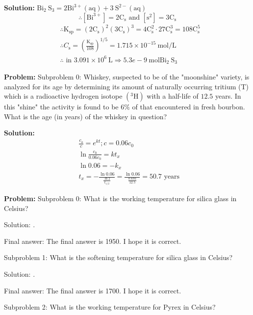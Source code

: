 \documentclass[10pt]{article}
\begin{document}
\textbf{Solution:}
$\mathrm{Bi}_{2} \mathrm{~S}_{3}=2 \mathrm{Bi}^{3+}(\mathrm{aq})+3 \mathrm{~S}^{2-}(\mathrm{aq})$
\[
\therefore\left[\mathrm{Bi}^{3+}\right]=2 \mathrm{C}_{\mathrm{s}} \text { and }\left[\mathrm{s}^{2}\right]=3 \mathrm{C}_{\mathrm{s}}
\]
\[
\begin{aligned}
& \therefore \mathrm{K}_{\mathrm{sp}}=\left(2 \mathrm{C}_{\mathrm{s}}\right)^{2}\left(3 \mathrm{C}_{\mathrm{s}}\right)^{3}=4 \mathrm{C}_{\mathrm{s}}^{2} \cdot 27 \mathrm{C}_{\mathrm{s}}^{3}=108 \mathrm{C}_{\mathrm{s}}^{5} \\
& \therefore C_{\mathrm{s}}=\left(\frac{\mathrm{K}_{\mathrm{sp}}}{108}\right)^{1 / 5}=1.715 \times 10^{-15} \mathrm{~mol} / \mathrm{L} \\
& \therefore \text { in } 3.091 \times 10^{6} \mathrm{~L} \Rightarrow \boxed{5.3e-9} \mathrm{~mol} \mathrm{Bi}_{2} \mathrm{~S}_{3}
\end{aligned}
\]


\textbf{Problem:}
Subproblem 0: Whiskey, suspected to be of the "moonshine" variety, is analyzed for its age by determining its amount of naturally occurring tritium (T) which is a radioactive hydrogen isotope $\left({ }^{3} \mathrm{H}\right)$ with a half-life of $12.5$ years. In this "shine" the activity is found to be $6 \%$ of that encountered in fresh bourbon. What is the age (in years) of the whiskey in question?


\textbf{Solution:}
\[
\begin{aligned}
&\frac{c_{o}}{c}=e^{k t} ; c=0.06 c_{0} \\
&\ln \frac{c_{0}}{0.06 c_{0}}=k t_{x} \\
&\ln 0.06=-k_{x} \\
&t_{x}=-\frac{\ln 0.06}{\frac{\ln 2}{t_{1 / 2}}}=\frac{\ln 0.06}{\frac{0.693}{12.5}}= \boxed{50.7} \text { years }
\end{aligned}
\]


\textbf{Problem:}
Subproblem 0: What is the working temperature for silica glass in Celsius?


Solution: .

Final answer: The final answer is 1950. I hope it is correct.

Subproblem 1: What is the softening temperature for silica glass in Celsius?


Solution: .

Final answer: The final answer is 1700. I hope it is correct.

Subproblem 2: What is the working temperature for Pyrex in Celsius?
\end{document}
